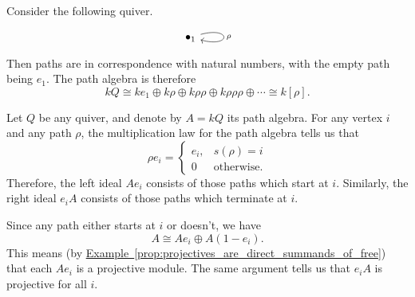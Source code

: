 \documentclass[main.tex]{subfiles}
\begin{document}
\begin{example}
  Consider the following quiver.
  \begin{equation*}
    \begin{tikzcd}
      \bullet_{1}
      \arrow[loop right, looseness=15, "\rho"]
    \end{tikzcd}
  \end{equation*}
  Then paths are in correspondence with natural numbers, with the empty path being $e_{1}$. The path algebra is therefore
  \begin{equation*}
    kQ \cong ke_{1} \oplus k\rho \oplus k\rho\rho \oplus k\rho\rho\rho \oplus \cdots \cong k[\rho].
  \end{equation*}
\end{example}
\begin{example}
  \label{eg:left_ideals_of_path_algebra_are_projective}
  Let $Q$ be any quiver, and denote by $A = kQ$ its path algebra. For any vertex $i$ and any path $\rho$, the multiplication law for the path algebra tells us that
  \begin{equation*}
    \rho e_{i} =
    \begin{cases}
      e_{i}, & s(\rho) = i \\
      0 & \text{otherwise}.
    \end{cases}
  \end{equation*}
  Therefore, the left ideal $A e_{i}$ consists of those paths which start at $i$. Similarly, the right ideal $e_{i} A$ consists of those paths which terminate at $i$.

  Since any path either starts at $i$ or doesn't, we have
  \begin{equation*}
    A \cong Ae_{i} \oplus A(1 - e_{i}).
  \end{equation*}
  This means (by \hyperref[prop:projectives_are_direct_summands_of_free]{Example~\ref*{prop:projectives_are_direct_summands_of_free}}) that each $Ae_{i}$ is a projective module. The same argument tells us that $e_{i}A$ is projective for all $i$.
\end{example}
\end{document}
